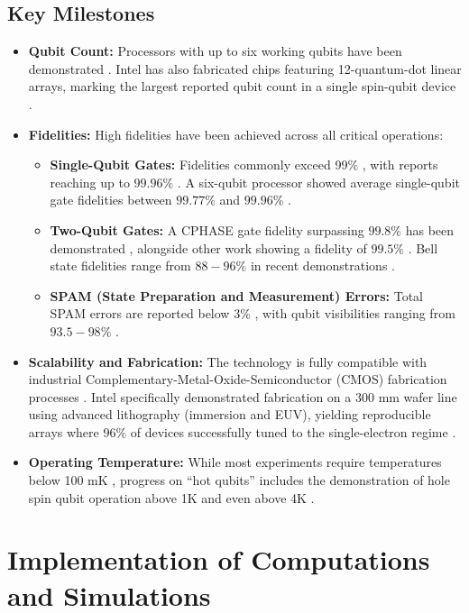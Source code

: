 \subsection{Key Milestones}
\begin{itemize}
    \item \textbf{Qubit Count:} Processors with up to six working qubits have been demonstrated \cite{ref11}. Intel has also fabricated chips featuring 12-quantum-dot linear arrays, marking the largest reported qubit count in a single spin-qubit device \cite{ref10}.
    \item \textbf{Fidelities:} High fidelities have been achieved across all critical operations:
    \begin{itemize}
        \item \textbf{Single-Qubit Gates:} Fidelities commonly exceed 99\% \cite{ref1}, with reports reaching up to $99.96\%$ \cite{ref9}. A six-qubit processor showed average single-qubit gate fidelities between $99.77\%$ and $99.96\%$ \cite{ref11}.
        \item \textbf{Two-Qubit Gates:} A CPHASE gate fidelity surpassing $99.8\%$ has been demonstrated \cite{ref1}, alongside other work showing a fidelity of $99.5\%$ \cite{ref9}. Bell state fidelities range from $88-96\%$ in recent demonstrations \cite{ref11}.
        \item \textbf{SPAM (State Preparation and Measurement) Errors:} Total SPAM errors are reported below $3\%$ \cite{ref1}, with qubit visibilities ranging from $93.5-98\%$ \cite{ref11}.
    \end{itemize}
    \item \textbf{Scalability and Fabrication:} The technology is fully compatible with industrial Complementary-Metal-Oxide-Semiconductor (CMOS) fabrication processes \cite{ref2, ref5, ref7, ref10}. Intel specifically demonstrated fabrication on a $300$ mm wafer line using advanced lithography (immersion and EUV), yielding reproducible arrays where $96\%$ of devices successfully tuned to the single-electron regime \cite{ref10}.
    \item \textbf{Operating Temperature:} While most experiments require temperatures below 100 mK \cite{ref5}, progress on ``hot qubits'' includes the demonstration of hole spin qubit operation above 1K and even above 4K \cite{ref6}.
\end{itemize}

\section{Implementation of Computations and Simulations}

